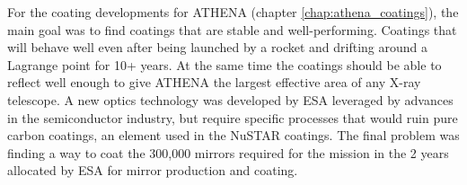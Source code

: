 For the coating developments for ATHENA (chapter \ref{chap:athena_coatings}), the main goal was to find coatings that are stable and well-performing. Coatings that will behave well even after being launched by a rocket and drifting around a Lagrange point for 10+ years. At the same time the coatings should be able to reflect well enough to give ATHENA the largest effective area of any X-ray telescope. A new optics technology was developed by ESA leveraged by advances in the semiconductor industry, but require specific processes that would ruin pure carbon coatings, an element used in the NuSTAR coatings. The final problem was finding a way to coat the 300,000 mirrors required for the mission in the 2 years allocated by ESA for mirror production and coating.

